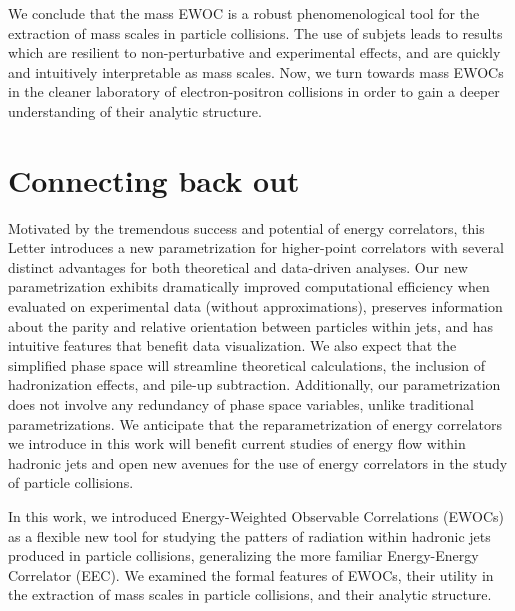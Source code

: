 We conclude that the mass EWOC is a robust phenomenological tool for the extraction of mass scales in particle collisions.
%
The use of subjets leads to results which are resilient to non-perturbative and experimental effects, and are quickly and intuitively interpretable as mass scales.
%
Now, we turn towards mass EWOCs in the cleaner laboratory of electron-positron collisions in order to gain a deeper understanding of their analytic structure.




\section{Connecting back out}


Motivated by the tremendous success and potential of energy correlators, this Letter introduces a new parametrization for higher-point correlators with several distinct advantages for both theoretical and data-driven analyses.
%
Our new parametrization exhibits dramatically improved computational efficiency when evaluated on experimental data (without approximations), preserves information about the parity and relative orientation between particles within jets, and has intuitive features that benefit data visualization.
%
We also expect that the simplified phase space will streamline theoretical calculations, the inclusion of hadronization effects, and pile-up subtraction.
%
Additionally, our parametrization does not involve any redundancy of phase space variables, unlike traditional parametrizations.
%
We anticipate that the reparametrization of energy correlators we introduce in this work will benefit current studies of energy flow within hadronic jets and open new avenues for the use of energy correlators in the study of particle collisions.



In this work, we introduced Energy-Weighted Observable Correlations (EWOCs) as a flexible new tool for studying the patters of radiation within hadronic jets produced in particle collisions, generalizing the more familiar Energy-Energy Correlator (EEC).
%
We examined the formal features of EWOCs, their utility in the extraction of mass scales in particle collisions, and their analytic structure.

